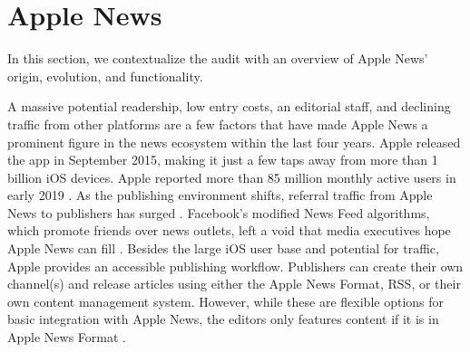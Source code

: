 \section{Apple News \label{sec:apple-news}}
In this section, we contextualize the audit with an overview of Apple News' origin, evolution, and functionality.

A massive potential readership, low entry costs, an editorial staff, and declining traffic from other platforms are a few factors that have made Apple News a prominent figure in the news ecosystem within the last four years. Apple released the app in September 2015, making it just a few taps away from more than 1 billion iOS devices. Apple reported more than 85 million monthly active users in early 2019 \citep{Feiner2019}. As the publishing environment shifts, referral traffic from Apple News to publishers has surged \citep{Oremus2018,Tran}. Facebook's modified News Feed algorithms, which promote friends over news outlets, left a void that media executives hope Apple News can fill \citep{Weiss}. Besides the large iOS user base and potential for traffic, Apple provides an accessible publishing workflow. Publishers can create their own channel(s) and release articles using either the Apple News Format, RSS, or their own content management system. However, while these are flexible options for basic integration with Apple News, the editors only features content if it is in Apple News Format \citep{AppleInc.}.








